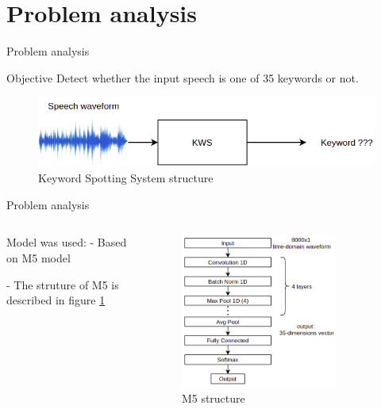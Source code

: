 \section{Problem analysis}

\begin{frame}{Problem analysis}
  \begin{block}{Objective}
    Detect whether the input speech is one of 35 keywords or not.
  \end{block}
  \begin{figure}
    \includegraphics[width=\textwidth]{figure/KWS.png}
    \caption{Keyword Spotting System structure}
  \end{figure}
\end{frame}

\begin{frame}{Problem analysis}
  \begin{columns}
    \begin{column}{0.3\textwidth}
      \begin{block}{Model was used:}
        - Based on M5 model \autocite{7952190}

        - The struture of M5 is described in figure \ref{fig:m5-model}
      \end{block}
    \end{column}

    \begin{column}{0.6\textwidth}
      \begin{figure}
        \includegraphics[width=0.8\textwidth]{figure/m5model.png}
        \caption{M5 structure}
        \label{fig:m5-model}
      \end{figure}
    \end{column}
  \end{columns}
\end{frame}

